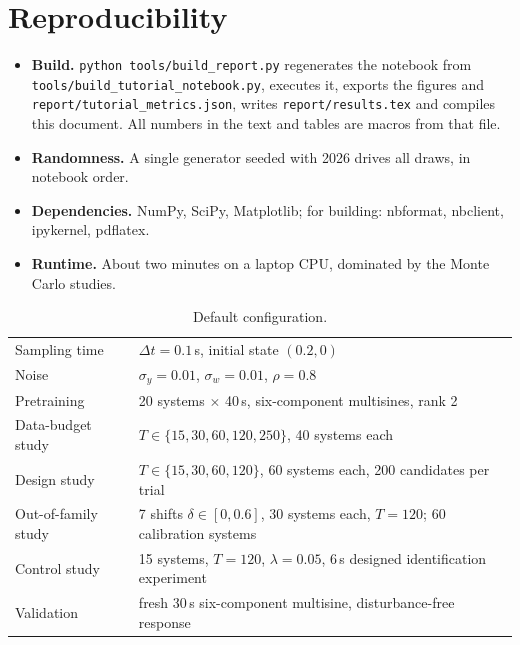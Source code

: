 \documentclass[11pt,a4paper]{article}
\begin{document}
\appendix
\section{Reproducibility}

\begin{itemize}\sloppy
  \item \textbf{Build.} \texttt{python tools/build\_report.py} regenerates the notebook from
        \texttt{tools/build\_tutorial\_notebook.py}, executes it, exports the figures and
        \texttt{report/tutorial\_metrics.json}, writes \texttt{report/results.tex} and compiles this
        document. All numbers in the text and tables are macros from that file.
  \item \textbf{Randomness.} A single generator seeded with 2026 drives all draws, in notebook
        order.
  \item \textbf{Dependencies.} NumPy, SciPy, Matplotlib; for building: nbformat, nbclient,
        ipykernel, pdflatex.
  \item \textbf{Runtime.} About two minutes on a laptop CPU, dominated by the Monte Carlo studies.
\end{itemize}

\begin{table}[h]
  \centering\small
  \caption{Default configuration.}
  \begin{tabular}{ll}
    \toprule
    Sampling time & $\Delta t=0.1$\,s, initial state $(0.2, 0)$\\
    Noise & $\sigma_y=0.01$, $\sigma_w=0.01$, $\rho=0.8$\\
    Pretraining & 20 systems $\times$ 40\,s, six-component multisines, rank 2\\
    Data-budget study & $T\in\{15,30,60,120,250\}$, 40 systems each\\
    Design study & $T\in\{15,30,60,120\}$, 60 systems each, 200 candidates per trial\\
    Out-of-family study & 7 shifts $\delta\in[0,0.6]$, 30 systems each, $T=120$; 60 calibration systems\\
    Control study & 15 systems, $T=120$, $\lambda=0.05$, 6\,s designed identification experiment\\
    Validation & fresh 30\,s six-component multisine, disturbance-free response\\
    \bottomrule
  \end{tabular}
\end{table}
\end{document}
